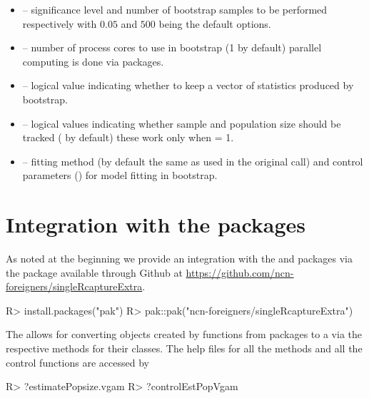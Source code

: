 \documentclass[
]{jss}
\newcommand{\1}{\mathcal{I}} \newcommand{\bZero}{\boldsymbol{0}}
\begin{document}
\begin{itemize}
  \item {} -- significance level and number of bootstrap samples to be performed respectively with $0.05$ and $500$ being the default options.
  \item {} -- number of process cores to use in bootstrap (1 by default) parallel computing is done via  packages.
  \item {} --  logical value indicating whether to keep a vector of statistics produced by bootstrap.
  \item {} --  logical values indicating whether sample and population size should be tracked ( by default) these work only when  = 1.
    \item {} -- fitting method (by default the same as used in the original call) and control parameters () for model fitting in bootstrap.
\end{itemize}

\section[Integration with the]{Integration with the 
packages}\label{VGAMcountreg-packages}

As noted at the beginning we provide an integration with the 
and  packages via the  package
available through Github at
\url{https://github.com/ncn-foreigners/singleRcaptureExtra}.

\begin{CodeChunk}
\begin{CodeInput}
R> install.packages("pak")
R> pak::pak("ncn-foreigners/singleRcaptureExtra")
\end{CodeInput}
\end{CodeChunk}

The  allows for converting objects created by
 functions from packages 
to a  via the respective
 methods for their classes. The help files for all
the methods and all the control functions are accessed by

\begin{CodeChunk}
\begin{CodeInput}
R> ?estimatePopsize.vgam
R> ?controlEstPopVgam
\end{CodeInput}
\end{CodeChunk}
\end{document}
